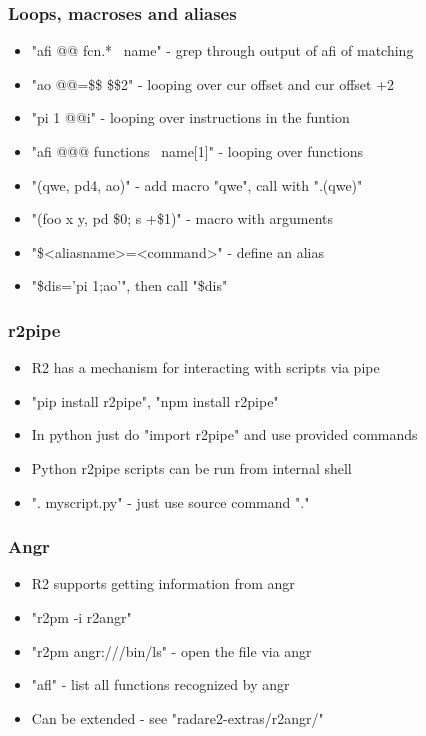 \documentclass[10pt,pdf,utf8,english,compress,hyperref={unicode}]{beamer}
\begin{document}
\begin{frame}[fragile]
  \frametitle{Loops, macroses and aliases}
  \begin{itemize}
	  \item "afi @@ fcn.* ~name" - grep through output of afi of matching
	  \item "ao @@=\$\$ \$\$2" - looping over cur offset and cur offset +2
	  \item "pi 1 @@i" - looping over instructions in the funtion
	  \item "afi @@@ functions ~name[1]" - looping over functions
	  \item "(qwe, pd4, ao)" - add macro "qwe", call with ".(qwe)"
	  \item "(foo x y, pd \$0; s +\$1)" - macro with arguments
	  \item "\$<aliasname>=<command>" - define an alias
	  \item "\$dis='pi 1;ao'", then call "\$dis"
  \end{itemize}
\end{frame}

\begin{frame}[fragile]
  \frametitle{r2pipe}
  \begin{itemize}
	  \item R2 has a mechanism for interacting with scripts via pipe
	  \item "pip install r2pipe", "npm install r2pipe"
	  \item In python just do "import r2pipe" and use provided commands
	  \item Python r2pipe scripts can be run from internal shell
	  \item ". myscript.py" - just use source command "."
  \end{itemize}
\end{frame}

\begin{frame}[fragile]
  \frametitle{Angr}
  \begin{itemize}
	  \item R2 supports getting information from angr
	  \item "r2pm -i r2angr"
	  \item "r2pm angr:///bin/ls" - open the file via angr
	  \item "afl" - list all functions recognized by angr
	  \item Can be extended - see "radare2-extras/r2angr/"
  \end{itemize}
\end{frame}
\end{document}
